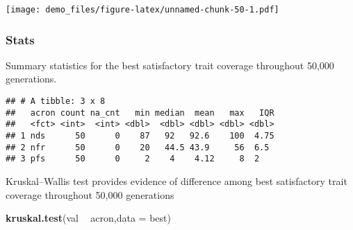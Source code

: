 \documentclass[]{book}
\newenvironment{Shaded}{\begin{snugshade}}{\end{snugshade}}
\newcommand{\DataTypeTok}[1]{\textcolor[rgb]{0.13,0.29,0.53}{#1}}
\newcommand{\KeywordTok}[1]{\textcolor[rgb]{0.13,0.29,0.53}{\textbf{#1}}}
\newcommand{\NormalTok}[1]{#1}
\newcommand{\OperatorTok}[1]{\textcolor[rgb]{0.81,0.36,0.00}{\textbf{#1}}}
\newcommand{\OtherTok}[1]{\textcolor[rgb]{0.56,0.35,0.01}{#1}}
\newcommand{\StringTok}[1]{\textcolor[rgb]{0.31,0.60,0.02}{#1}}
\begin{document}
\texttt{[image: demo\_files/figure-latex/unnamed-chunk-50-1.pdf]}

\hypertarget{stats-8}{%
\subsubsection{Stats}\label{stats-8}}

Summary statistics for the best satisfactory trait coverage throughout 50,000 generations.

\begin{Shaded}
\end{Shaded}

\begin{verbatim}
## # A tibble: 3 x 8
##   acron count na_cnt   min median  mean   max   IQR
##   <fct> <int>  <int> <dbl>  <dbl> <dbl> <dbl> <dbl>
## 1 nds      50      0    87   92   92.6    100  4.75
## 2 nfr      50      0    20   44.5 43.9     56  6.5 
## 3 pfs      50      0     2    4    4.12     8  2
\end{verbatim}

Kruskal--Wallis test provides evidence of difference among best satisfactory trait coverage throughout 50,000 generations

\begin{Shaded}
\begin{Highlighting}[]
\KeywordTok{kruskal.test}\NormalTok{(val }\OperatorTok{~}\StringTok{ }\NormalTok{acron,}\DataTypeTok{data =}\NormalTok{ best)}
\end{Highlighting}
\end{Shaded}
\end{document}
